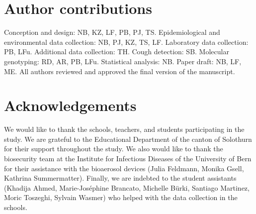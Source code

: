\documentclass[fleqn,11pt]{wlscirep}
\begin{document}
\section*{Author contributions}
Conception and design: NB, KZ, LF, PB, PJ, TS. Epidemiological and environmental data collection: NB, PJ, KZ, TS, LF. Laboratory data collection: PB, LFu. Additional data collection: TH. Cough detection: SB. Molecular genotyping: RD, AR, PB, LFu. Statistical analysis: NB. Paper draft: NB, LF, ME. All authors reviewed and approved the final version of the manuscript.


\section*{Acknowledgements}
We would like to thank the schools, teachers, and students participating in the study. We are grateful to the Educational Department of the canton of Solothurn for their support throughout the study. We also would like to thank the biosecurity team at the Institute for Infectious Diseases of the University of Bern for their assistance with the bioaerosol devices (Julia Feldmann, Monika Gsell, Kathrina Summermatter). Finally, we are indebted to the student assistants (Khadija Ahmed, Marie-Joséphine Brancato, Michelle Bürki, Santiago Martinez, Moric Toszeghi, Sylvain Wasmer) who helped with the data collection in the schools.


\end{document}

